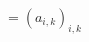 \documentclass[preview]{standalone}
\begin{document}
\begin{align*}
= (a_{i,k})_{i,k}
\end{align*}
\end{document}
